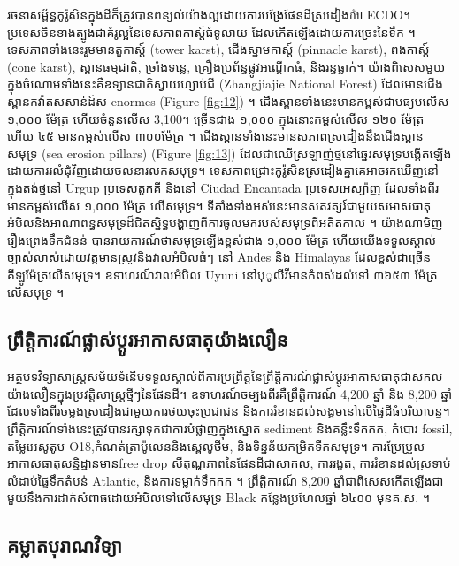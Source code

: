 \documentclass[10pt,twocolumn,letterpaper]{article}
\begin{document}
រចនាសម្ព័ន្ធកូរ៉ូសិនក្នុងដីក៏ត្រូវបានពន្យល់យ៉ាងល្អដោយការបង្រែផែនដីស្រដៀងกับ ECDO។ ប្រទេសចិនខាងត្បូងជាគំរូល្អនៃទេសភាពកាស្ត៍ធំទូលាយ ដែលកើតឡើងដោយការច្រេះនៃទឹក \cite{82}។ ទេសភាពទាំងនេះរួមមានតួកាស្ត៍ (tower karst), ជើងស្នាមកាស្ត៍ (pinnacle karst), ពងកាស្ត៍ (cone karst), ស្ពានធម្មជាតិ, ច្រាំងទន្លេ, គ្រឿងប្រព័ន្ធផ្លូវអណ្តើកធំ, និងរន្ធធ្លាក់។ យ៉ាងពិសេសមួយក្នុងចំណោមទាំងនេះគឺឧទ្យានជាតិស្វាយហ្សាប់ជី (Zhangjiajie National Forest) ដែលមានជើងស្ពានកវ៉ាតសសាន់ដ៍ស enormes (Figure \ref{fig:12}) \cite{84}។ ជើងស្ពានទាំងនេះមានកម្ពស់ជាមធ្យមលើស ១,០០០ ម៉ែត្រ ហើយចំនួនលើស 3,100។ ច្រើនជាង ១,០០០ ក្នុងនោះកម្ពស់លើស ១២០ ម៉ែត្រ ហើយ ៤៥ មានកម្ពស់លើស ៣០០ម៉ែត្រ \cite{85}។ ជើងស្ពានទាំងនេះមានសភាពស្រដៀងនឹងជើងស្ពានសមុទ្រ (sea erosion pillars) (Figure \ref{fig:13}) ដែលជាឈើស្រឡាញ់ថ្មនៅឆ្នេរសមុទ្របង្កើតឡើងដោយការរលំជុំវិញដោយចលនារលកសមុទ្រ។ ទេសភាពជ្រោះកូរ៉ូសិនស្រដៀងគ្នាគេអាចរកឃើញនៅក្នុងតង់ថ្មនៅ Urgup ប្រទេសតួកគី និងនៅ Ciudad Encantada ប្រទេសអេស្ប៉ាញ ដែលទាំងពីរមានកម្ពស់លើស ១,០០០ ម៉ែត្រ លើសមុទ្រ។ ទីតាំងទាំងអស់នេះមានសតវត្សរ៍ជាមួយសមាសធាតុអំបិលនិងអាណាពន្ធសមុទ្រដ៏ជិតស្និទ្ធបង្ហាញពីការចូលមករបស់សមុទ្រពីអតីតកាល \cite{15,86,87}។ យ៉ាងណាមិញ រឿងព្រេងទឹកជំនន់ \cite{3} បានរាយការណ៍ថាសមុទ្រឡើងខ្ពស់ជាង ១,០០០ ម៉ែត្រ ហើយយើងទទួលស្គាល់ច្បាស់លាស់ដោយវត្តមានស្រូវនិងវាលអំបិលធំៗ នៅ Andes និង Himalayas ដែលខ្ពស់ជាច្រើនគីឡូម៉ែត្រលើសមុទ្រ។ ឧទាហរណ៍វាលអំបិល Uyuni នៅបុូលីវីមានកំពស់ដល់ទៅ ៣៦៥៣ ម៉ែត្រ លើសមុទ្រ \cite{94}។

\subsection{ព្រឹត្តិការណ៍ផ្លាស់ប្ដូរអាកាសធាតុយ៉ាងលឿន}

អត្ថបទវិទ្យាសាស្ត្រសម័យទំនើបទទួលស្គាល់ពីការប្រព្រឹត្ដនៃព្រឹត្តិការណ៍ផ្លាស់ប្ដូរអាកាសធាតុជាសកលយ៉ាងលឿនក្នុងប្រវត្តិសាស្ត្រថ្មីៗនៃផែនដី។ ឧទាហរណ៍ចម្បងពីរគឺព្រឹត្តិការណ៍ 4,200 ឆ្នាំ និង 8,200 ឆ្នាំ ដែលទាំងពីរចម្លងស្រដៀងជាមួយការថយចុះប្រជាជន និងការរំខានដល់សង្គមនៅលើផ្ទៃដីធំបរិយាបន្ន។ ព្រឹត្តិការណ៍ទាំងនេះត្រូវបានរក្សាទុកជាការបំផ្លាញក្នុងស្នោត sediment និងគន្លឹះទឹកកក, កំបោរ fossil, តម្លៃអេសូតូប O18,កំណត់ត្រាប៉ូលេននិងស្ពេលូថឹម, និងទិន្នន័យកម្រិតទឹកសមុទ្រ។ ការប្រែប្រួលអាកាសធាតុសន្និដ្ឋានមានfree drop សីតុណ្ហភាពនៃផែនដីជាសាកល, ការរងួត, ការរំខានដល់ស្រទាប់លំដាប់ផ្ទៃទឹកតំបន់ Atlantic, និងការទម្លាក់ទឹកកក \cite{90,91,92}។ ព្រឹត្តិការណ៍ 8,200 ឆ្នាំជាពិសេសកើតឡើងជាមួយនឹងការដាក់សំពាធដោយអំបិលទៅលើសមុទ្រ Black កន្លែងប្រហែលឆ្នាំ ៦៤០០ មុនគ.ស. \cite{93}។

\subsection{គម្លាតបុរាណវិទ្យា}
\end{document}

